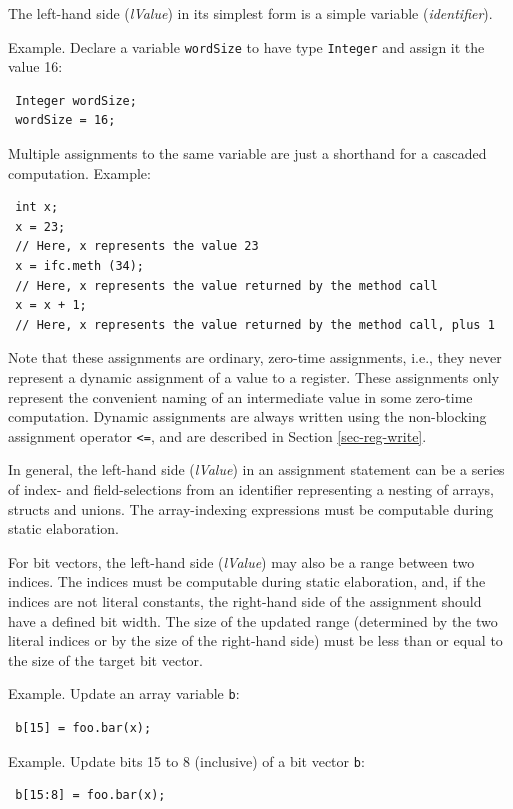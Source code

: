 \documentclass[twoside,letterpaper]{article}
\newcommand{\nterm}[1]{\emph{#1}}
\newcommand{\term}[1]{\texttt{#1}}
\begin{document}
The left-hand side (\nterm{lValue}) in its simplest form is a simple
variable (\nterm{identifier}).

Example.  Declare a variable \texttt{wordSize} to have type \texttt{Integer}
and assign it the value 16:
\begin{verbatim}
 Integer wordSize;
 wordSize = 16;
\end{verbatim}

Multiple assignments to the same variable are just a shorthand for a
cascaded computation.  Example:
\begin{verbatim}
 int x;
 x = 23;
 // Here, x represents the value 23
 x = ifc.meth (34);
 // Here, x represents the value returned by the method call
 x = x + 1;
 // Here, x represents the value returned by the method call, plus 1
\end{verbatim}

Note that these assignments are ordinary, zero-time assignments, i.e.,
they never represent a dynamic assignment of a value to a register.
These assignments only represent the convenient naming of an
intermediate value in some zero-time computation.  Dynamic assignments
are always written using the non-blocking assignment operator
\term{<=}, and are described in Section {\ref{sec-reg-write}}.

In general, the left-hand side (\nterm{lValue}) in an assignment
statement can be a series of index- and field-selections from an
identifier representing a nesting of arrays, structs and unions.  The
array-indexing expressions must be computable during static
elaboration.

For bit vectors, the left-hand side (\nterm{lValue}) may also be a range between
two indices. The indices must be computable during static elaboration, and, if
the indices are not literal constants, the right-hand side of the assignment
should have a defined bit width. The size of the updated range (determined
by the two literal indices or by the size of the right-hand side) must be
less than or equal to the size of the target bit vector.

Example.  Update an array variable \texttt{b}:
\begin{verbatim}
 b[15] = foo.bar(x);
\end{verbatim}

Example.  Update bits 15 to 8 (inclusive) of a bit vector \texttt{b}:
\begin{verbatim}
 b[15:8] = foo.bar(x);
\end{verbatim}
\end{document}
